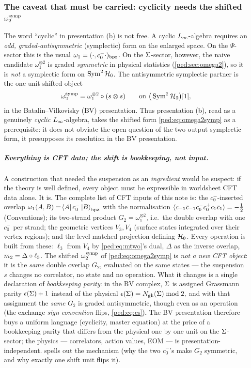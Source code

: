 \subsubsection{The caveat that must be carried: cyclicity needs the shifted
\texorpdfstring{$\omega_2^{\rm symp}$}{omega-2}}
\label{ped:sec:two:caveat}

The word \enquote{cyclic} in presentation (b) is not free. A cyclic $L_\infty$-algebra requires
an \emph{odd, graded-antisymmetric} (symplectic) form on the enlarged space. On the
$\Psi$-sector this is the usual $\omega_1=(\cdot,c_0^-\cdot)_{\rm bpz}$. On the $\Sigma$-sector,
however, the naive candidate $\omega_1^{\otimes2}$ is graded \emph{symmetric} in physical
statistics (\cref{ped:sec:omega2}), so it is \emph{not} a symplectic form on
$\operatorname{Sym}^2\mathcal{H}_0$. The antisymmetric symplectic partner is the one-unit-shifted object
\begin{equation}
	\omega_2^{\rm symp}=\omega_1^{\otimes2}\circ(s\otimes s)
	\qquad\text{on }\big(\operatorname{Sym}^2\mathcal{H}_0\big)[1],
	\label{ped:eq:omega2symp}
\end{equation}
in the Batalin--Vilkovisky (BV) presentation. Thus presentation (b), read as a genuinely
\emph{cyclic} $L_\infty$-algebra, takes the shifted form \eqref{ped:eq:omega2symp} as a
prerequisite: it does not obviate the open question of the two-output symplectic form,
it presupposes its resolution in the BV presentation.

\subparagraph{Everything is CFT data; the shift is bookkeeping, not input.} A construction
that needed the suspension as an \emph{ingredient} would be suspect: if the theory is
well defined, every object must be expressible in worldsheet CFT data alone. It is. The
complete list of CFT inputs of this note is: the $c_0^-$-inserted overlap
$\omega_1(A,B)=\mathinner{{}_{}\hspace{-2pt}\langle A |}c_0^-\ket{B}_{\rm bpz}$ with the normalisation
$\langle c_{-1}\bar c_{-1}c_0^-c_0^+c_1\bar c_1 \rangle=-\tfrac12$ (Conventions); its two-strand
product $G_2=\omega_1^{\otimes2}$, i.e.\ the double overlap with one $c_0^-$ per strand;
the geometric vertices $V_3,V_4$ (surface states integrated over their vertex regions);
and the level-matched projection defining $\mathcal{H}_0$. Every operation is built from these:
$\ell_3$ from $V_4$ by \eqref{ped:eq:mtwo}'s dual, $\Delta$ as the inverse overlap, $m_2=
\Delta\circ\ell_3$. The shifted $\omega_2^{\rm symp}$ of \eqref{ped:eq:omega2symp} is
\emph{not a new CFT object}: it is the \emph{same} double overlap $G_2$, evaluated on the
same states --- the suspension $s$ changes no correlator, no state and no operation. What
it changes is a single declaration of \emph{bookkeeping parity}: in the BV complex, $\Sigma$
is assigned Grassmann parity $\epsilon(\Sigma)+1$ instead of the physical
$\epsilon(\Sigma)=N_{\text{gh}}(\Sigma)\bmod2$, and with that assignment the \emph{same} $G_2$
is graded antisymmetric, though even as an operation (the exchange \emph{sign convention} flips,
\cref{ped:eq:cs}). The BV presentation therefore buys a uniform language (cyclicity, master
equation) at the price of a bookkeeping parity that differs from the physical one by one
unit on the $\Sigma$-sector; the physics --- correlators, action values, EOM --- is
presentation-independent.  spells out the mechanism (why the two
$c_0^-$'s make $G_2$ symmetric, and why exactly one shift unit flips it).

